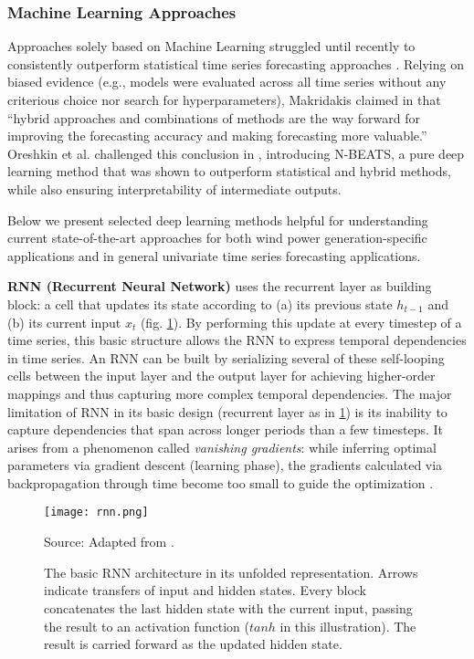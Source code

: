 \pagebreak
\subsubsection{Machine Learning Approaches}\label{subsubsec:ml_methods}

Approaches solely based on Machine Learning struggled until recently to consistently outperform statistical time series forecasting approaches \cite{makridakis2018m4}.
Relying on biased evidence (e.g., models were evaluated across all time series without any criterious choice nor search for hyperparameters), Makridakis claimed in \cite{makridakis2018m4} that ``hybrid approaches and combinations of methods are the way forward for improving the forecasting accuracy and making forecasting more valuable.''
Oreshkin et al. challenged this conclusion in \cite{oreshkin2019nbeats}, introducing N-BEATS, a pure deep learning method that was shown to outperform statistical and hybrid methods, while also ensuring interpretability of intermediate outputs.

Below we present selected deep learning methods helpful for understanding current state-of-the-art approaches for both wind power generation-specific applications and in general univariate time series forecasting applications.

\vspace{1em}
\noindent
\textbf{RNN (Recurrent Neural Network)} uses the recurrent layer as building block: a cell that updates its state according to (a) its previous state $h_{t-1}$ and (b) its current input $x_t$ (fig. \ref{fig:rnn}). By performing this update at every timestep of a time series, this basic structure allows the RNN to express temporal dependencies in time series. An RNN can be built by serializing several of these self-looping cells between the input layer and the output layer for achieving higher-order mappings and thus capturing more complex temporal dependencies.
The major limitation of RNN in its basic design (recurrent layer as in \ref{fig:rnn}) is its inability to capture dependencies that span across longer periods than a few timesteps.
It arises from a phenomenon called \textit{vanishing gradients}: while inferring optimal parameters via gradient descent (learning phase), the gradients calculated via backpropagation through time become too small to guide the optimization \cite{paneru2015lstm}.
\begin{figure}[H]
	\centering
    \caption{The basic RNN architecture in its unfolded representation. Arrows indicate transfers of input and hidden states. Every block concatenates the last hidden state with the current input, passing the result to an activation function ($tanh$ in this illustration). The result is carried forward as the updated hidden state.}
    \texttt{[image: rnn.png]}  \\
    \raggedright
    Source: Adapted from \cite{paneru2015lstm}.
	\label{fig:rnn}
\end{figure}

